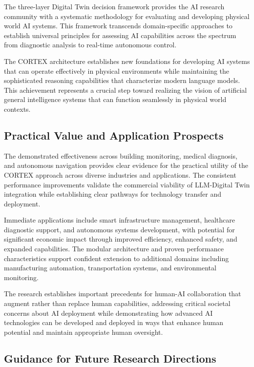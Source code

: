 The three-layer Digital Twin decision framework provides the AI research community with a systematic methodology for evaluating and developing physical world AI systems. This framework transcends domain-specific approaches to establish universal principles for assessing AI capabilities across the spectrum from diagnostic analysis to real-time autonomous control.

The CORTEX architecture establishes new foundations for developing AI systems that can operate effectively in physical environments while maintaining the sophisticated reasoning capabilities that characterize modern language models. This achievement represents a crucial step toward realizing the vision of artificial general intelligence systems that can function seamlessly in physical world contexts.

\subsection{Practical Value and Application Prospects}

The demonstrated effectiveness across building monitoring, medical diagnosis, and autonomous navigation provides clear evidence for the practical utility of the CORTEX approach across diverse industries and applications. The consistent performance improvements validate the commercial viability of LLM-Digital Twin integration while establishing clear pathways for technology transfer and deployment.

Immediate applications include smart infrastructure management, healthcare diagnostic support, and autonomous systems development, with potential for significant economic impact through improved efficiency, enhanced safety, and expanded capabilities. The modular architecture and proven performance characteristics support confident extension to additional domains including manufacturing automation, transportation systems, and environmental monitoring.

The research establishes important precedents for human-AI collaboration that augment rather than replace human capabilities, addressing critical societal concerns about AI deployment while demonstrating how advanced AI technologies can be developed and deployed in ways that enhance human potential and maintain appropriate human oversight.

\subsection{Guidance for Future Research Directions}

